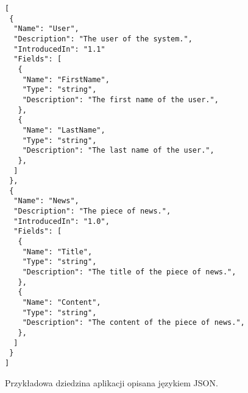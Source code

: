 \begin{figure}[!ht]
\begin{verbatim}
[
 {
  "Name": "User",
  "Description": "The user of the system.",
  "IntroducedIn": "1.1"
  "Fields": [
   {
    "Name": "FirstName",
    "Type": "string",
    "Description": "The first name of the user.",
   },
   {
    "Name": "LastName",
    "Type": "string",
    "Description": "The last name of the user.",
   },
  ]
 },
 {
  "Name": "News",
  "Description": "The piece of news.",
  "IntroducedIn": "1.0",
  "Fields": [
   {
    "Name": "Title",
    "Type": "string",
    "Description": "The title of the piece of news.",
   },
   {
    "Name": "Content",
    "Type": "string",
    "Description": "The content of the piece of news.",
   },
  ]
 }
]
\end{verbatim}

\caption{Przykładowa dziedzina aplikacji opisana językiem JSON.}
\label{fig:implementation_core:json}
\end{figure}
